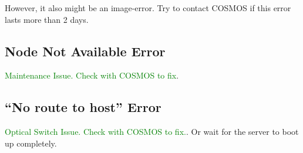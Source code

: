 \documentclass{article}
\begin{document}
        However, it also might be an image-error. Try to contact COSMOS if this error lasts more than 2 days. 
        
\subsection{Node Not Available Error}
    \textcolor{green}{Maintenance Issue. Check with COSMOS to fix}.
    
\subsection{``No route to host'' Error}
    \textcolor{green}{Optical Switch Issue. Check with COSMOS to fix.}.  Or wait for the server to boot up completely. 


        
    




\end{document}
